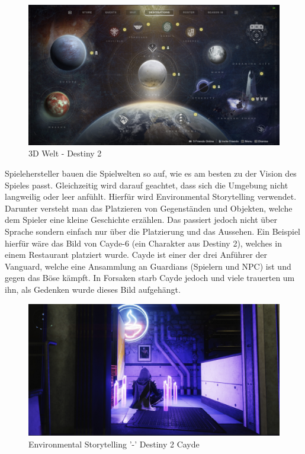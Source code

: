\begin{figure}
    \centering
    \includegraphics[scale=0.3]{pics/3d_welt_destiny_planets}
    \caption{3D Welt - Destiny 2}
    \label{fig:3d_environment_destiny2}
\end{figure}

Spielehersteller bauen die Spielwelten so auf, wie es am besten zu der Vision des Spieles passt.
Gleichzeitig wird darauf geachtet, dass sich die Umgebung nicht langweilig oder leer anfühlt.
Hierfür wird Environmental Storytelling verwendet.
Darunter versteht man das Platzieren von Gegenständen und Objekten,
welche dem Spieler eine kleine Geschichte erzählen.
Das passiert jedoch nicht über Sprache sondern einfach nur über die Platzierung und das Aussehen.
Ein Beispiel hierfür w\"are das Bild von Cayde-6 (ein Charakter aus Destiny 2), welches in einem Restaurant platziert wurde.
Cayde ist einer der drei Anführer der Vanguard, welche eine Ansammlung an Guardians (Spielern und NPC) ist und gegen das Böse kämpft.
In Forsaken starb Cayde jedoch und viele trauerten um ihn, als Gedenken wurde dieses Bild aufgehängt.
~\cite{GameDeveloper_2022}

\begin {figure}
    \includegraphics[scale=0.3]{pics/3d_welt_destiny2-environmental-storytelling}
    \caption{Environmental Storytelling '-' Destiny 2 Cayde}
    \label{fig:3d_environmental_storytelling_destiny2}
\end {figure}


